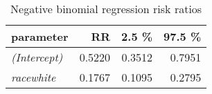 \begin{wraptable}{r}{2in}

\caption{\label{tab:neg_bin_reg_RR}Negative binomial regression risk ratios}
\centering
\fontsize{9}{11}\selectfont
\begin{tabular}[t]{>{}lrrr}
\toprule
parameter & RR & 2.5 \% & 97.5 \%\\
\midrule
\em{(Intercept)} & 0.5220 & 0.3512 & 0.7951\\
\em{racewhite} & 0.1767 & 0.1095 & 0.2795\\
\bottomrule
\end{tabular}
\end{wraptable}
